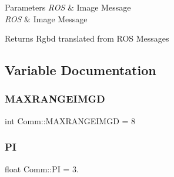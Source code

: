 \begin{DoxyParams}{Parameters}
{\em R\+OS} & Image Message \\
\hline
{\em R\+OS} & Image Message\\
\hline
\end{DoxyParams}
\begin{DoxyReturn}{Returns}
Rgbd translated from R\+OS Messages 
\end{DoxyReturn}


\subsection{Variable Documentation}
\mbox{\label{namespace_comm_a8f60d778070dabbe4b6fa39157309097}} 
\subsubsection{\texorpdfstring{M\+A\+X\+R\+A\+N\+G\+E\+I\+M\+GD}{MAXRANGEIMGD}}
{\footnotesize\ttfamily int Comm\+::\+M\+A\+X\+R\+A\+N\+G\+E\+I\+M\+GD = 8}

\mbox{\label{namespace_comm_a7d4da4b3fc818fb4d75a7df90df80152}} 
\subsubsection{\texorpdfstring{PI}{PI}}
{\footnotesize\ttfamily float Comm\+::\+PI = 3.}

